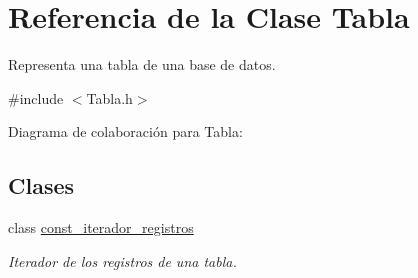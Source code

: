 \hypertarget{classTabla}{}\section{Referencia de la Clase Tabla}
\label{classTabla}


Representa una tabla de una base de datos.  




{\ttfamily \#include $<$Tabla.\+h$>$}



Diagrama de colaboración para Tabla\+:
\subsection*{Clases}
\begin{DoxyCompactItemize}
\item 
class \mbox{\hyperlink{classTabla_1_1const__iterador__registros}{const\+\_\+iterador\+\_\+registros}}
\begin{DoxyCompactList}\small\item\em Iterador de los registros de una tabla. \end{DoxyCompactList}\end{DoxyCompactItemize}
